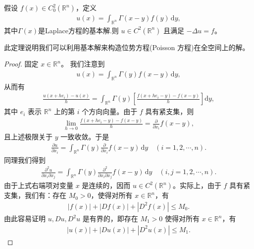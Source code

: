 \documentclass[../../main.tex]{subfiles}%
\begin{document}
\begin{theorem}\label{theorem:Laplace方程基本解的性质}
假设 $f(x)\in C_0^2(\mathbb{R}^n)$，定义
\begin{align*}
u(x) = \int_{\mathbb{R}^n} \varGamma (x-y)f(y)\,\mathrm{d}y,
\end{align*}
其中$\varGamma (x)$是Laplace方程的基本解.则 $u\in C^2(\mathbb{R}^n)$ 且满足 $-\Delta u=f$。
\end{theorem}
\begin{remark}
此定理说明我们可以利用基本解来构造位势方程(Poisson 方程)在全空间上的解。
\end{remark}
\begin{proof}
固定 $x\in\mathbb{R}^n$。
我们注意到
\begin{align*}
u(x) = \int_{\mathbb{R}^n} \varGamma (y)f(x-y)\,\mathrm{d}y,
\end{align*}
从而有
\begin{align*}
\frac{u(x+he_i)-u(x)}{h} = \int_{\mathbb{R}^n} \varGamma (y)\left[ \frac{f(x+he_i-y)-f(x-y)}{h} \right] \mathrm{d}y,
\end{align*}
其中 $e_i$ 表示 $\mathbb{R}^n$ 上的第 $i$ 个方向向量。由于 $f$ 具有紧支集，则
\begin{align*}
\lim_{h\to 0} \frac{f(x+he_i-y)-f(x-y)}{h} = \frac{\partial}{\partial x_i} f(x-y),
\end{align*}
且上述极限关于 $y$ 一致收敛。于是
\begin{align*}
\frac{\partial u}{\partial x_i} = \int_{\mathbb{R}^n} \varGamma (y) \frac{\partial}{\partial x_i} f(x-y)\,\mathrm{d}y \quad (i=1,2,\cdots,n).
\end{align*}
同理我们得到
\begin{align*}
\frac{\partial^2 u}{\partial x_i\partial x_j} = \int_{\mathbb{R}^n} \varGamma (y) \frac{\partial^2}{\partial x_i\partial x_j} f(x-y)\,\mathrm{d}y \quad (i,j=1,2,\cdots,n).
\end{align*}
由于上式右端项对变量 $x$ 是连续的，因而 $u\in C^2(\mathbb{R}^n)$。实际上，由于 $f$ 具有紧支集，我们有：存在 $M_0>0$，使得对所有 $x\in\mathbb{R}^n$，有
\begin{align*}
|f(x)| + |Df(x)| + |D^2f(x)| \leqslant M_0.
\end{align*}
由此容易证明 $u, Du, D^2u$ 是有界的，即存在 $M_1>0$ 使得对所有 $x\in\mathbb{R}^n$，有
\begin{align*}
|u(x)| + |Du(x)| + |D^2u(x)| \leqslant M_1.
\end{align*}


\end{proof}
\end{document}
